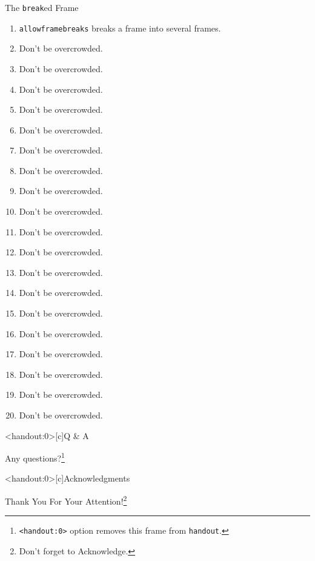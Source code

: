 \documentclass[
        ]{beamer}
\begin{document}
\begin{frame}[allowframebreaks]{The \texttt{break}ed Frame} %
    \begin{enumerate}
    \item \texttt{allowframebreaks} breaks a frame into several frames.
    \item Don't be overcrowded.
    \item Don't be overcrowded.
    \item Don't be overcrowded.
    \item Don't be overcrowded.

    \item Don't be overcrowded.
    \item Don't be overcrowded.
    \item Don't be overcrowded.
    \item Don't be overcrowded.
    \item Don't be overcrowded.
    
    \item Don't be overcrowded.
    \item Don't be overcrowded.
    \item Don't be overcrowded.
    \item Don't be overcrowded.
    \item Don't be overcrowded.
    
    \item Don't be overcrowded.
    \item Don't be overcrowded.
    \item Don't be overcrowded.
    \item Don't be overcrowded.
    \item Don't be overcrowded.
    \end{enumerate}
\end{frame}


\begin{frame}<handout:0>[c]{Q \& A}
    \centerline{\LARGE{Any questions?\footnote{\texttt{<handout:0>} option removes this frame from \texttt{handout}.}}}    
\end{frame}    
    
\begin{frame}<handout:0>[c]{Acknowledgments}
    \centerline{\LARGE{Thank You For Your Attention!\footnote{Don't forget to Acknowledge.}}} 
\end{frame}
    
    
\end{document}
